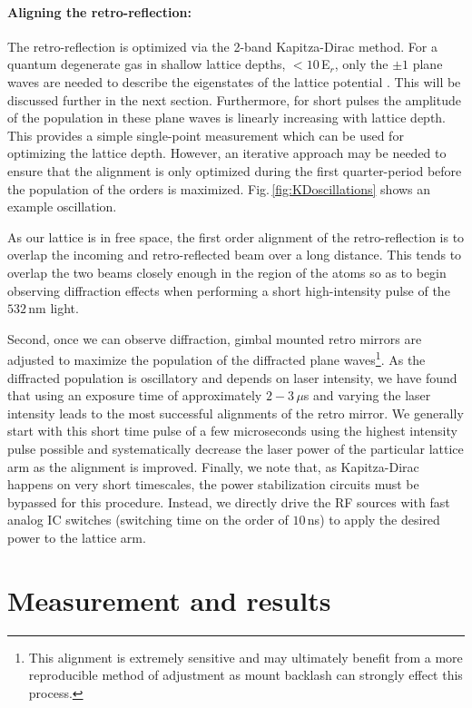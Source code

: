 \paragraph{Aligning the retro-reflection:}
The retro-reflection is optimized via the 2-band Kapitza-Dirac method.
For a quantum degenerate gas in shallow lattice depths, $<10$\,E$_r$, only the $\pm1$ plane waves are needed to describe the eigenstates of the lattice potential \cite{Fallani2005,Denschlag2002}.
This will be discussed further in the next section.
Furthermore, for short pulses the amplitude of the population in these plane waves is linearly increasing with lattice depth.
This provides a simple single-point measurement which can be used for optimizing the lattice depth.
However, an iterative approach may be needed to ensure that the alignment is only optimized during the first quarter-period before the population of the orders is maximized.
Fig.\,\ref{fig:KDoscillations} shows an example oscillation.

As our lattice is in free space, the first order alignment of the retro-reflection is to overlap the incoming and retro-reflected beam over a long distance.
This tends to overlap the two beams closely enough in the region of the atoms so as to begin observing diffraction effects when performing a short high-intensity pulse of the $532$\,nm light.

Second, once we can observe diffraction, gimbal mounted retro mirrors are adjusted to maximize the population of the diffracted plane waves\footnote{This alignment is extremely sensitive and may ultimately benefit from a more reproducible method of adjustment as mount backlash can strongly effect this process.}.
As the diffracted population is oscillatory and depends on laser intensity, we have found that using an exposure time of approximately $2 - 3$\,$\mu$s and varying the laser intensity leads to the most successful alignments of the retro mirror.
We generally start with this short time pulse of a few microseconds using the highest intensity pulse possible and systematically decrease the laser power of the particular lattice arm as the alignment is improved.
Finally, we note that, as Kapitza-Dirac happens on very short timescales, the power stabilization circuits must be bypassed for this procedure.
Instead, we directly drive the RF sources with fast analog IC switches (switching time on the order of $10$\,ns) to apply the desired power to the lattice arm.

\section{Measurement and results}
